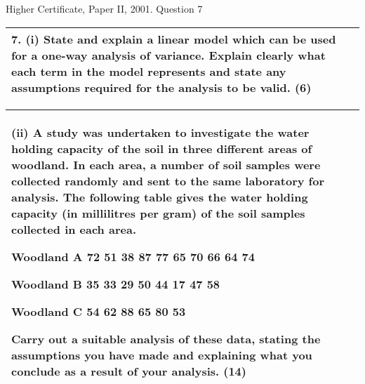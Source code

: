 \documentclass[a4paper,12pt]{article}
\begin{document}

Higher Certificate, Paper II, 2001. Question 7
\begin{table}[ht!]
 
\centering
 
\begin{tabular}{|p{15cm}|}
 
\hline  

7. (i) State and explain a linear model which can be used for a one-way analysis of variance.  Explain clearly what each term in the model represents and state any assumptions required for the analysis to be valid. (6) 
 
\\ \hline
  
\end{tabular}

\end{table} 
 
\begin{table}[ht!]
 
\centering
 
\begin{tabular}{|p{15cm}|}
 
\hline  

 (ii) A study was undertaken to investigate the water holding capacity of the soil in three different areas of woodland.  In each area, a number of soil samples were collected randomly and sent to the same laboratory for analysis.  The following table gives the water holding capacity (in millilitres per gram) of the soil samples collected in each area. 
 
      Woodland A  72  51  38  87  77  65  70  66  64  74 
 
      Woodland B  35  33  29  50  44  17  47  58 
 
      Woodland C 54  62  88  65  80  53 
 
  Carry out a suitable analysis of these data, stating the assumptions you have made and explaining what you conclude as a result of your analysis. (14) 


\\ \hline
  
\end{tabular}

\end{table} 
\end{document}
